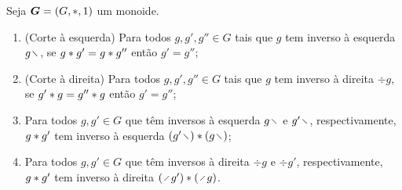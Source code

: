 \begin{proposition}
Seja $\bm G = (G,\ast,1)$ um monoide.
	\begin{enumerate}
	\item (Corte à esquerda) Para todos $g,g',g'' \in G$ tais que $g$ tem inverso à esquerda $g \vid$, se $g \ast g' = g \ast g''$ então $g'=g''$;
	\item (Corte à direita) Para todos $g,g',g'' \in G$ tais que $g$ tem inverso à direita $\div g$, se $g' \ast g = g'' \ast g$ então $g'=g''$;
	\item Para todos $g,g' \in G$ que têm inversos à esquerda $g \vid$ e $g' \vid$, respectivamente, $g \ast g'$ tem inverso à esquerda $(g' \vid) \opb (g \vid)$;
	\item Para todos $g,g' \in G$ que têm inversos à direita $\div g$ e $\div g'$, respectivamente, $g \ast g'$ tem inverso à direita $(\div g') \opb (\div g)$.
	\end{enumerate}
\end{proposition}
